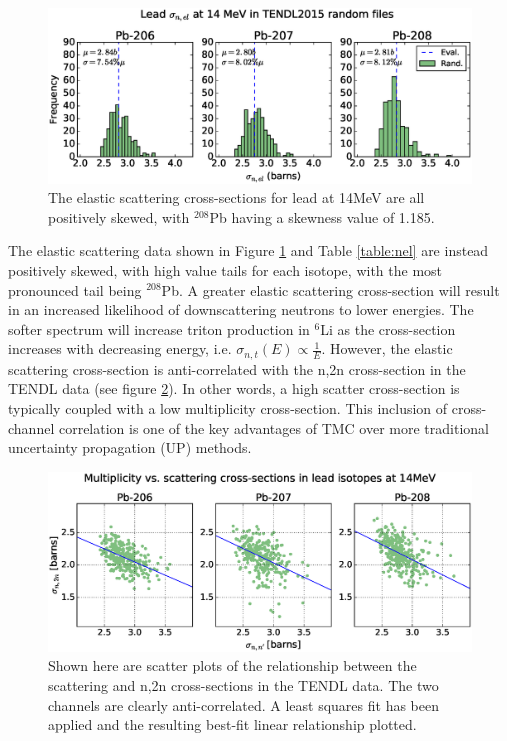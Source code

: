 \begin{figure}[H]
  \includegraphics[width=\textwidth]{pb_tendl_nel_hist}
  \caption{The elastic scattering cross-sections for lead at 14MeV are all positively skewed, with $^{208}$Pb having a skewness value of 1.185.}
  \label{fig:tendl_nel}
\end{figure}

The elastic scattering data shown in Figure \ref{fig:tendl_nel} and Table \ref{table:nel} are instead positively skewed, with high value tails for each isotope, with the most pronounced tail being $^{208}$Pb. A greater elastic scattering cross-section will result in an increased likelihood of downscattering neutrons to lower energies. The softer spectrum will increase triton production in $^{6}$Li as the cross-section increases with decreasing energy, i.e. $\sigma_{n,t}(E) \propto \frac{1}{E}$. However, the elastic scattering cross-section is anti-correlated with the n,2n cross-section in the TENDL data (see figure \ref{fig:pb_el_n2n_corr}). In other words, a high scatter cross-section is typically coupled with a low multiplicity cross-section. This inclusion of cross-channel correlation is one of the key advantages of TMC over more traditional uncertainty propagation (UP) methods. 


\begin{figure}[H]
	\includegraphics[width=\textwidth]{pb_el_n2n_corr}
  \caption{Shown here are scatter plots of the relationship between the scattering and n,2n cross-sections in the TENDL data. The two channels are clearly anti-correlated. A least squares fit has been applied and the resulting best-fit linear relationship plotted.}
	\label{fig:pb_el_n2n_corr}
\end{figure}

